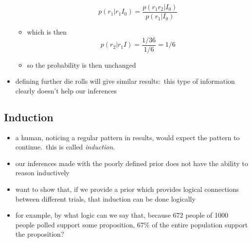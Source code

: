 \documentclass[../jaynes_prob_theory_notes.tex]{subfiles}
\begin{document}
\begin{itemize}
\begin{itemize}
                                \begin{equation*}
                                    p(r_1|r_{1}I_0) = \frac{p(r_{1}r_{2}|I_0)}{p(r_{1}|I_{0})}
                                \end{equation*}
                            \item which is then
                                \begin{equation*}
                                    p(r_2|r_{1}I) = \frac{1/36}{1/6} = 1/6
                                \end{equation*}
                            \item so the probability is then unchanged
                        \end{itemize}
                    \item defining further die rolls will give similar results:\ this type of information clearly doesn't help our inferences
                \end{itemize}

        \subsection{Induction}
            \begin{itemize}
                \item a human, noticing a regular pattern in results, would expect the pattern to continue.\ this is called \textit{induction}.
                \item our inferences made with the poorly defined prior does not have the ability to reason inductively
                \item want to show that, if we provide a prior which provides logical connections between different trials, that induction can be done logically
                \item for example, by what logic can we say that, because 672 people of 1000 people polled support some proposition, 67\% of the entire population support the proposition?
            \end{itemize}
\end{document}
